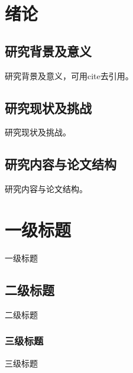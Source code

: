 \documentclass[openany,oneside]{book}
\begin{document}
\frontmatter
\sloppy %




\tableofcontents
{\xiaosi}
\clearpage{\pagestyle{empty}\cleardoublepage}

\mainmatter
{}                        %

\chapter{绪论}
\section{研究背景及意义}

研究背景及意义，可用cite去引用。\cite{marxapplication}

\lipsum

\section{研究现状及挑战}

研究现状及挑战。\cite{dean2008mapreduce, bzj2006constcurative}

\section{研究内容与论文结构}

研究内容与论文结构。

\chapter{一级标题}

一级标题

\section{二级标题}

{\hei 二级标题}

\subsection{三级标题}

三级标题
\end{document}
